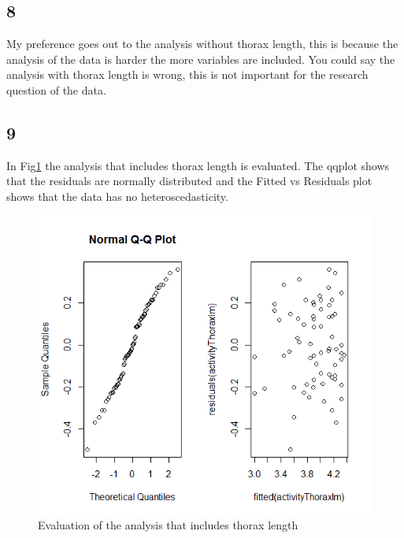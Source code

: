 \documentclass{article}
\begin{document}
    \subsection*{8}
      My preference goes out to the analysis without thorax length, this is because the analysis of the data is harder the more variables are included. You could say the analysis with thorax length is wrong, this is not important for the research question of the data.

    \subsection*{9}
      In Fig\ref{fig:eval} the analysis that includes thorax length is evaluated.
      The qqplot shows that the residuals are normally distributed and the Fitted vs Residuals plot shows that the data has no heteroscedasticity.
      \begin{figure}[H]
          \centering
          \includegraphics[scale=0.3]{../results/evalWithThorax.png}
          \caption{Evaluation of the analysis that includes thorax length}
          \label{fig:eval}
      \end{figure}
\end{document}
